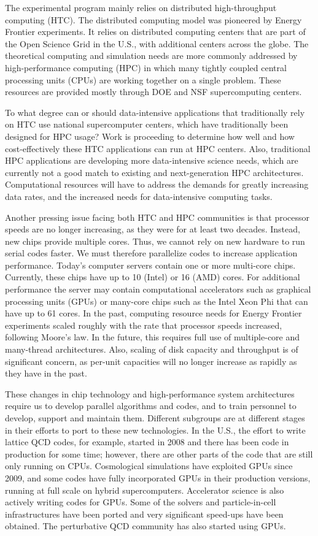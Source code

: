 The experimental program mainly relies on distributed
high-throughput computing (HTC). 
The distributed computing model was pioneered by Energy Frontier
experiments.  It relies on distributed computing
centers that are part of the Open Science Grid in the U.S.,
with additional centers across the globe. 
The theoretical computing and simulation needs are more commonly
addressed by high-performance computing (HPC) in which many
tightly coupled central processing units (CPUs) are working together on a single
problem. These resources are provided mostly through DOE and NSF
supercomputing centers.

To what degree can or should data-intensive applications that traditionally 
rely on HTC use national supercomputer centers, which have traditionally 
been designed for HPC usage?
Work is proceeding to determine how well and how cost-effectively these HTC
applications can run at HPC centers.
Also, traditional HPC applications are developing more data-intensive
science needs, which are currently not a good match to existing
and next-generation HPC architectures. Computational resources will have to
address the demands for greatly increasing data rates, and the increased
needs for data-intensive computing tasks.

Another pressing issue facing both HTC and HPC communities is that
processor speeds are no longer increasing, as they were for
at least two decades. Instead, new chips provide multiple
cores. Thus, we cannot rely on new hardware to run serial codes faster.
We must therefore parallelize codes to increase application performance. 
Today's computer servers contain one or more multi-core chips.  Currently,
these chips  have up to 10 (Intel) or 16 (AMD) cores. 
For additional performance the server may contain
computational accelerators such as graphical processing
units (GPUs) or many-core chips such as the Intel Xeon Phi that can have up
to 61 cores. 
In the past, computing resource needs for Energy Frontier experiments scaled
roughly with the rate that processor speeds increased, following Moore's
law. In the future, this requires full use of multiple-core and many-thread 
architectures. Also,
scaling of disk capacity and throughput is of
significant concern, as per-unit capacities will no longer increase as rapidly
as they have in the past.

These changes in chip technology and high-performance system architectures
require us to develop parallel algorithms and codes, and to train personnel
to develop, support and maintain them. Different subgroups are at different
stages in their efforts to port to these new technologies. 
In the U.S., the effort to write lattice QCD codes, for
example, started in 2008 and there has been code in
production for some time; however, there
are other parts of the code that are still only running on CPUs.
Cosmological simulations have exploited GPUs since 2009, and some 
codes have fully incorporated GPUs in their production versions, running 
at full scale on hybrid supercomputers.
Accelerator science is also actively writing codes for GPUs. Some of the
solvers and particle-in-cell infrastructures have been ported and very
significant speed-ups have been obtained. The perturbative QCD community
has also started using GPUs.

